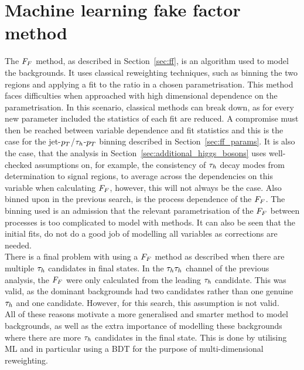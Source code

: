 \section{Machine learning fake factor method}
\label{sec:ml_ff}

The $F_{F}$ method, as described in Section~\ref{sec:ff}, is an algorithm used to model the \jtth backgrounds.
It uses classical reweighting techniques, such as binning the two regions and applying a fit to the ratio in a chosen parametrisation.
This method faces difficulties when approached with high dimensional dependence on the parametrisation.
In this scenario, classical  methods can break down, as for every new parameter included the statistics of each fit are reduced.
A compromise must then be reached between variable dependence and fit statistics and this is the case for the jet-$p_{T}$/$\tau_{h}$-$p_{T}$ binning described in Section~\ref{sec:ff_params}.
It is also the case, that the analysis in Section~\ref{sec:additional_higgs_bosons} uses well-checked assumptions on, for example, the consistency of $\tau_{h}$ decay modes from determination to signal regions, to average across the dependencies on this variable when calculating $F_{F}$, however, this will not always be the case.
Also binned upon in the previous search, is the process dependence of the $F_{F}$.
The binning used is an admission that the relevant parametrisation of the $F_{F}$ between processes is too complicated to model with  methods.
It can also be seen that the initial fits, do not do a good job of modelling all variables as corrections are needed. \\

There is a final problem with using a $F_{F}$ method as described when there are multiple $\tau_{h}$ candidates in final states. 
In the $\tau_{h}\tau_{h}$ channel of the previous analysis, the $F_{F}$ were only calculated from the leading $\tau_{h}$ candidate.
This was valid, as the dominant backgrounds had two \jtth candidates rather than one genuine $\tau_{h}$ and one \jtth candidate.
However, for this search, this assumption is not valid. \\

All of these reasons motivate a more generalised and smarter method to model \jtth backgrounds, as well as the extra importance of modelling these backgrounds where there are more $\tau_{h}$ candidates in the final state.
This is done by utilising \ac{ML} and in particular using a \ac{BDT} for the purpose of multi-dimensional reweighting. \\ 

